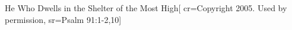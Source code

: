 {He Who Dwells in the Shelter of the Most High}[
    cr={Copyright 2005.  Used by permission},
    sr={Psalm 91:1-2,10}]
